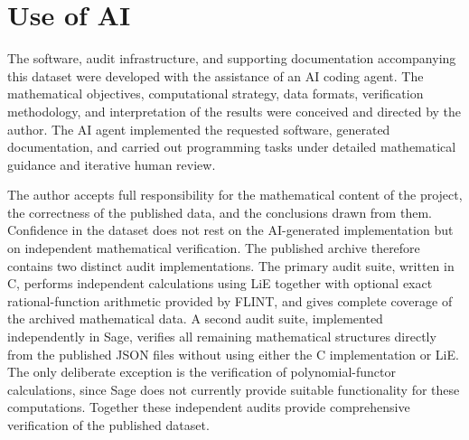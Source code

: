 \documentclass[12pt]{amsart}
\begin{document}
\section{Use of AI}

The software, audit infrastructure, and supporting documentation accompanying this dataset were developed with the assistance of an AI coding agent. The mathematical objectives, computational strategy, data formats, verification methodology, and interpretation of the results were conceived and directed by the author. The AI agent implemented the requested software, generated documentation, and carried out programming tasks under detailed mathematical guidance and iterative human review.

The author accepts full responsibility for the mathematical content of the project, the correctness of the published data, and the conclusions drawn from them. Confidence in the dataset does not rest on the AI-generated implementation but on independent mathematical verification. The published archive therefore contains two distinct audit implementations. The primary audit suite, written in C, performs independent calculations using LiE together with optional exact rational-function arithmetic provided by FLINT, and gives complete coverage of the archived mathematical data. A second audit suite, implemented independently in Sage, verifies all remaining mathematical structures directly from the published JSON files without using either the C implementation or LiE. The only deliberate exception is the verification of polynomial-functor calculations, since Sage does not currently provide suitable functionality for these computations. Together these independent audits provide comprehensive verification of the published dataset.



\end{document}
